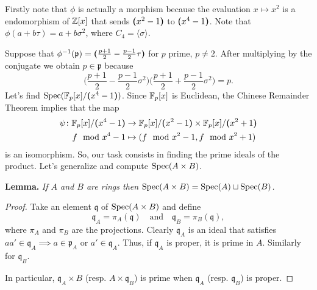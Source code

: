 \begin{solution}
    Firstly note that $\phi$ is actually a morphism because the evaluation $x\mapsto x^2$ is a endomorphism of $\mathbb{Z}[x]$ that sends $\textrm{\boldmath$($}x^2-1\textrm{\boldmath$)$}$ to $\textrm{\boldmath$($}x^4-1\textrm{\boldmath$)$}$. Note that $\phi(a+b\tau)=a + b\sigma^2$, where $C_4=\langle\sigma\rangle$.

    Suppose that $\phi^{-1}(\mathfrak p)=\textrm{\boldmath$($}\frac{p+1}2-\frac{p-1}2\tau\textrm{\boldmath$)$}$ for $p$ prime, $p\ne2$. After multiplying by the conjugate we obtain $p\in\mathfrak p$ because
    $$
        \Big(\frac{p+1}2-\frac{p-1}2\sigma^2\Big)
        \Big(\frac{p+1}2+\frac{p-1}2\sigma^2\Big) = p.
    $$
    Let's find $\operatorname{Spec}(\mathbb{F}_p[x]/\textrm{\boldmath$($}x^4-1\textrm{\boldmath$)$})$. Since $\mathbb{F}_p[x]$ is Euclidean, the Chinese Remainder Theorem implies that the map
    \begin{align*}
        \psi\colon\mathbb{F}_p[x]/\textrm{\boldmath$($}x^4-1\textrm{\boldmath$)$}&\to\mathbb{F}_p[x]/\textrm{\boldmath$($}x^2-1\textrm{\boldmath$)$}
            \times\mathbb{F}_p[x]/\textrm{\boldmath$($}x^2+1\textrm{\boldmath$)$}\\
        f\mod x^4-1&\mapsto(f\mod x^2-1,f\mod x^2+1)
    \end{align*}
    is an isomorphism. So, our task consists in finding the prime ideals of the product. Let's generalize and compute $\operatorname{Spec}(A\times B)$.

    \smallskip
    
    \textbf{Lemma.} \textit{If\/ $A$ and\/ $B$ are rings then\/ $\operatorname{Spec}(A\times B)=\operatorname{Spec}(A)\sqcup\operatorname{Spec}(B)$.}
        
    \begin{proof}
        Take an element $\mathfrak q$ of $\operatorname{Spec}(A\times B)$ and define
        $$
            \mathfrak q_A=\pi_A(\mathfrak q)\quad\text{and}\quad\mathfrak q_B=\pi_B(\mathfrak q),
        $$
        where $\pi_A$ and $\pi_B$ are the projections. Clearly $\mathfrak q_A$ is an ideal that satisfies $aa'\in\mathfrak q_A\implies a\in\mathfrak p_A$ or $a'\in\mathfrak q_A$. Thus, if $\mathfrak q_A$ is proper, it is prime in $A$. Similarly for $\mathfrak q_B$.

        In particular, $\mathfrak q_A\times B$ (resp. $A\times\mathfrak q_B$) is prime when $\mathfrak q_A$ (resp. $\mathfrak q_B$) is proper. 
        

\end{proof}
\end{solution}
